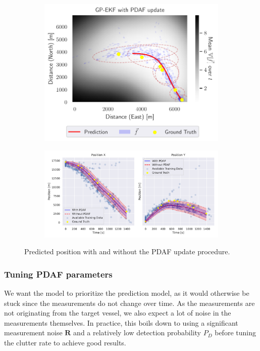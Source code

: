 \begin{figure}
    \centering
    \begin{subfigure}{\textwidth}
    \centering
    \includegraphics[width=\textwidth]{figures/dyngp/gp_ekf_with_pdaf.pdf}
    \end{subfigure}
    \begin{subfigure}{\textwidth}
    \centering
    \includegraphics[width=\textwidth]{figures/dyngp/gp_ekf_unc_with_pdaf.pdf}
    \end{subfigure}
    \caption{Predicted position with and without the PDAF update procedure.}
    \label{fig:gp_ekf_with_pdaf}
\end{figure}

\subsubsection{Tuning PDAF parameters}
We want the model to prioritize the prediction model, as it would otherwise be stuck since the measurements do not change over time. As the measurements are not originating from the target vessel, we also expect a lot of noise in the measurements themselves. In practice, this boils down to using a significant measurement noise $\boldsymbol{R}$ and a relatively low detection probability $P_D$ before tuning the clutter rate to achieve good results. 
